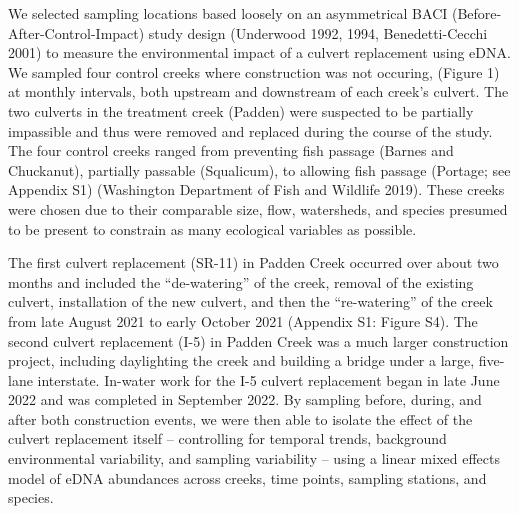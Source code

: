 \documentclass[
]{article}
\begin{document}
We selected sampling locations based loosely on an asymmetrical BACI
(Before-After-Control-Impact) study design (Underwood 1992, 1994,
Benedetti-Cecchi 2001) to measure the environmental impact of a culvert
replacement using eDNA. We sampled four control creeks where
construction was not occuring, (Figure 1) at monthly intervals, both
upstream and downstream of each creek's culvert. The two culverts in the
treatment creek (Padden) were suspected to be partially impassible and
thus were removed and replaced during the course of the study. The four
control creeks ranged from preventing fish passage (Barnes and
Chuckanut), partially passable (Squalicum), to allowing fish passage
(Portage; see Appendix S1) (Washington Department of Fish and Wildlife
2019). These creeks were chosen due to their comparable size, flow,
watersheds, and species presumed to be present to constrain as many
ecological variables as possible.

The first culvert replacement (SR-11) in Padden Creek occurred over
about two months and included the ``de-watering'' of the creek, removal
of the existing culvert, installation of the new culvert, and then the
``re-watering'' of the creek from late August 2021 to early October 2021
(Appendix S1: Figure S4). The second culvert replacement (I-5) in Padden
Creek was a much larger construction project, including daylighting the
creek and building a bridge under a large, five-lane interstate.
In-water work for the I-5 culvert replacement began in late June 2022
and was completed in September 2022. By sampling before, during, and
after both construction events, we were then able to isolate the effect
of the culvert replacement itself -- controlling for temporal trends,
background environmental variability, and sampling variability -- using
a linear mixed effects model of eDNA abundances across creeks, time
points, sampling stations, and species.
\end{document}
